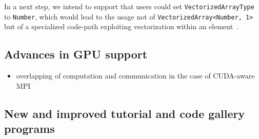 \documentclass{ansarticle-preprint}
\begin{document}

In a next step, we intend to support that users could set 
\texttt{VectorizedArrayType} to \texttt{Number}, which would lead to the usage not 
of \texttt{VectorizedArray<Number, 1>} but of a specialized code-path exploiting 
vectorization within an element~\cite{KronbichlerKormann2019}.

\subsection{Advances in GPU support}
\label{subsec:gpu}

\begin{itemize}
\item overlapping of computation and communication in the case of CUDA-aware MPI
\end{itemize}


\subsection{New and improved tutorial and code gallery programs}
\label{subsec:steps}
\end{document}
